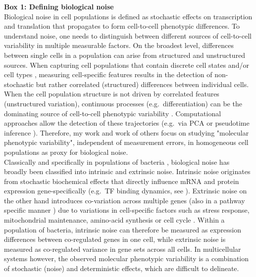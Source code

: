 \begin{Comment}
\hspace{-2.5mm}\textbf{Box 1: Defining biological noise}\label{box1}\\
\small
Biological noise in cell populations is defined as stochastic effects on transcription and translation that propagates to form cell-to-cell phenotypic differences. 
To understand noise, one needs to distinguish between different sources of cell-to-cell variability in multiple measurable factors. 
On the broadest level, differences between single cells in a population can arise from structured and unstructured sources. 
When capturing cell populations that contain discrete cell states and/or cell types \citep{Paul2015, Ibarra-Soria2018, Rosenberg2018}, measuring cell-specific features results in the detection of non-stochastic but rather correlated (structured) differences between individual cells. 
When the cell population structure is not driven by correlated features (unstructured variation), continuous processes (e.g.~differentiation) can be the dominating source of cell-to-cell phenotypic variability \citep{Dahlin2018}. 
Computational approaches allow the detection of these trajectories (e.g.~via \gls{PCA} or pseudotime inference \citep{Trapnell2014, Angerer2015}). 
Therefore, my work and work of others \citep{Faure2017, Morgan2018} focus on studying "molecular phenotypic variability", independent of measurement errors, in homogeneous cell populations as proxy for biological noise. \\

Classically and specifically in populations of bacteria \citep{Elowitz2002}, biological noise has broadly been classified into intrinsic and extrinsic noise. 
Intrinsic noise originates from stochastic biochemical effects that directly influence mRNA and protein expression gene-specifically (e.g.~\gls{TF} binding dynamics, see \citep{Swain2002}). 
Extrinsic noise on the other hand introduces co-variation across multiple genes (also in a pathway specific manner \citep{Raser2005}) due to variations in cell-specific factors such as stress response, mitochondrial maintenance, amino-acid synthesis \citep{Stewart-Ornstein2012} or cell cycle \citep{Zopf2013}. 
Within a population of bacteria, intrinsic noise can therefore be measured as expression differences between co-regulated genes in one cell, while extrinsic noise is measured as co-regulated variance in gene sets across all cells.
In multicellular systems however, the observed molecular phenotypic variability is a combination of stochastic (noise) and deterministic effects, which are difficult to delineate.
\end{Comment}

